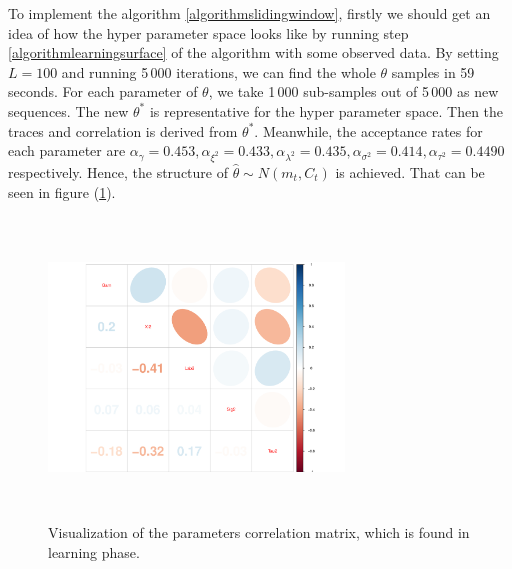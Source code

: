 To implement the algorithm \ref{algorithmslidingwindow}, firstly we should get an idea of how the hyper parameter space looks like by running step \ref{algorithmlearningsurface} of the algorithm with some observed data. By setting $L=100$ and running 5\,000 iterations, we can find the whole $\theta$ samples in 59 seconds. For each parameter of $\theta$, we take 1\,000 sub-samples out of 5\,000 as new sequences. The new $\theta^*$ is representative for the hyper parameter space. Then the traces and correlation is derived from $\theta^*$. Meanwhile, the acceptance rates for each parameter are $\alpha_\gamma = 0.453,\alpha_{\xi^2}=0.433, \alpha_{\lambda^2}=0.435, \alpha_{\sigma^2}=0.414, \alpha_{\tau^2}=0.4490$ respectively. Hence, the structure of  $\hat{\theta}\sim N\left( m_t,C_t\right)$ is achieved. That can be seen in figure (\ref{realdatacorMatrix}). 
\begin{figure}[h]
\centering
\includegraphics[width=0.7\textwidth,height=8cm]{Chapters/05MCMCOU/plots/realdatalearningcorMatrix.pdf}
\caption{Visualization of the parameters correlation matrix, which is found in learning phase. }\label{realdatacorMatrix}
\end{figure}


